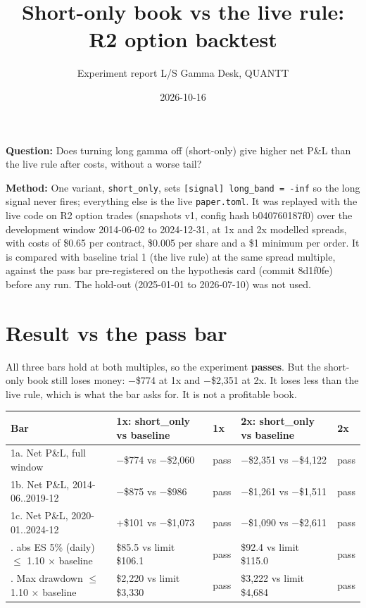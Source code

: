 \documentclass{article}
\title{Short-only book vs the live rule: R2 option backtest}
\author{Experiment report \textperiodcentered{} L/S Gamma Desk, QUANTT}
\date{2026-10-16}
\begin{document}
\maketitle

\textbf{Question:} Does turning long gamma off (short-only) give higher net P\&L than the live rule after costs, without a worse tail?

\textbf{Method:} One variant, \texttt{short\_\allowbreak{}only}, sets \texttt{[signal] long\_\allowbreak{}band = -\allowbreak{}inf} so the long signal never fires; everything else is the live \texttt{paper.\allowbreak{}toml}. It was replayed with the live code on R2 option trades (snapshots v1, config hash b040760187f0) over the development window 2014-06-02 to 2024-12-31, at 1x and 2x modelled spreads, with costs of \$0.65 per contract, \$0.005 per share and a \$1 minimum per order. It is compared with baseline trial 1 (the live rule) at the same spread multiple, against the pass bar pre-registered on the hypothesis card (commit 8d1f0fe) before any run. The hold-out (2025-01-01 to 2026-07-10) was not used.

\section{Result vs the pass bar}

All three bars hold at both multiples, so the experiment \textbf{passes}. But the short-only book still loses money: \ensuremath{-}\$774 at 1x and \ensuremath{-}\$2,351 at 2x. It loses less than the live rule, which is what the bar asks for. It is not a profitable book.

\begin{center}\small
\begin{tabularx}{\linewidth}{>{\raggedright\arraybackslash}X >{\raggedright\arraybackslash}X l >{\raggedright\arraybackslash}X l}
\toprule
\textbf{Bar} & \textbf{1x: short\_only vs baseline} & \textbf{1x} & \textbf{2x: short\_only vs baseline} & \textbf{2x} \\
\midrule
1a. Net P\&L, full window & \ensuremath{-}\$774 vs \ensuremath{-}\$2,060 & pass & \ensuremath{-}\$2,351 vs \ensuremath{-}\$4,122 & pass \\
1b. Net P\&L, 2014-06..2019-12 & \ensuremath{-}\$875 vs \ensuremath{-}\$986 & pass & \ensuremath{-}\$1,261 vs \ensuremath{-}\$1,511 & pass \\
1c. Net P\&L, 2020-01..2024-12 & +\$101 vs \ensuremath{-}\$1,073 & pass & \ensuremath{-}\$1,090 vs \ensuremath{-}\$2,611 & pass \\
2. abs ES 5\% (daily) \ensuremath{\leq} 1.10 \ensuremath{\times} baseline & \$85.5 vs limit \$106.1 & pass & \$92.4 vs limit \$115.0 & pass \\
3. Max drawdown \ensuremath{\leq} 1.10 \ensuremath{\times} baseline & \$2,220 vs limit \$3,330 & pass & \$3,222 vs limit \$4,684 & pass \\
\bottomrule
\end{tabularx}
\end{center}
\end{document}
